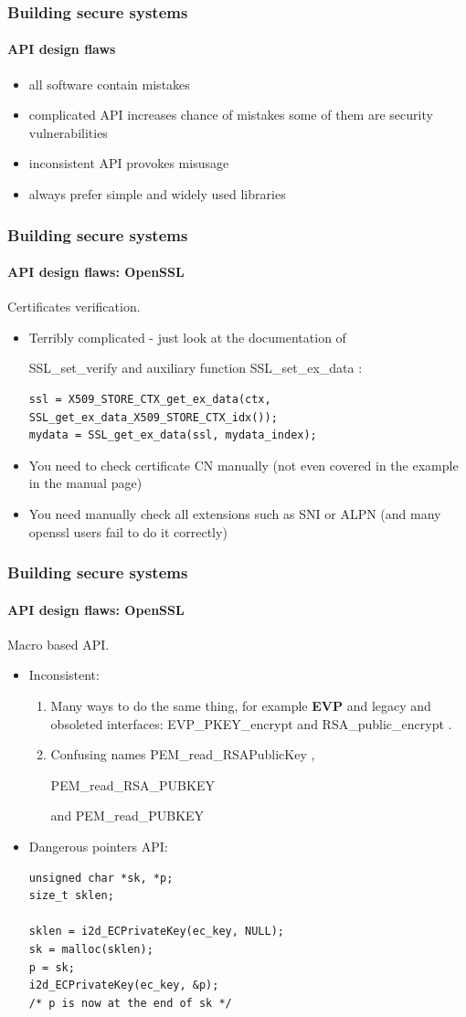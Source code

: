 \documentclass[12pt,t]{beamer}
\newcommand{\funcname}[1]{
	{\color{yellow!30} #1}
}
\begin{document}
\begin{frame}
\frametitle{Building secure systems}
\framesubtitle{API design flaws}
\begin{itemize}
\item<1-> all software contain mistakes
\item<2-> complicated API increases chance of mistakes some of them are security 
vulnerabilities
\item<3-> inconsistent API provokes misusage
\item<4-> always prefer simple and widely used libraries
\end{itemize}
\end{frame}

\begin{frame}[fragile]
\frametitle{Building secure systems}
\framesubtitle{API design flaws: OpenSSL}
Certificates verification.
\begin{itemize}
\item Terribly complicated - just look at the documentation of 
\funcname{SSL\_set\_verify} and auxiliary function \funcname{SSL\_set\_ex\_data}:
\begin{tiny}
\begin{verbatim}
ssl = X509_STORE_CTX_get_ex_data(ctx, SSL_get_ex_data_X509_STORE_CTX_idx());
mydata = SSL_get_ex_data(ssl, mydata_index);
\end{verbatim}
\end{tiny}
\item You need to check certificate CN manually (not even covered in the example in 
the manual page)
\item You need manually check all extensions such as SNI or ALPN (and many openssl users 
fail to do it correctly)
\end{itemize}
\end{frame}

\begin{frame}[fragile]
\frametitle{Building secure systems}
\framesubtitle{API design flaws: OpenSSL}
Macro based API.
\begin{itemize}
\item Inconsistent: 
\begin{enumerate}
\item Many ways to do the same thing, for example \textbf{EVP} and legacy and obsoleted 
interfaces: \funcname{EVP\_PKEY\_encrypt} and \funcname{RSA\_public\_encrypt}.
\item Confusing names \funcname{PEM\_read\_RSAPublicKey}, 
\funcname{PEM\_read\_RSA\_PUBKEY} 
and \funcname{PEM\_read\_PUBKEY}
\end{enumerate}
\item Dangerous pointers API:
\begin{tiny}
\begin{verbatim}
unsigned char *sk, *p;
size_t sklen;

sklen = i2d_ECPrivateKey(ec_key, NULL);
sk = malloc(sklen);
p = sk;
i2d_ECPrivateKey(ec_key, &p);
/* p is now at the end of sk */
\end{verbatim}
\end{tiny}
\end{itemize}
\end{frame}
\end{document}
